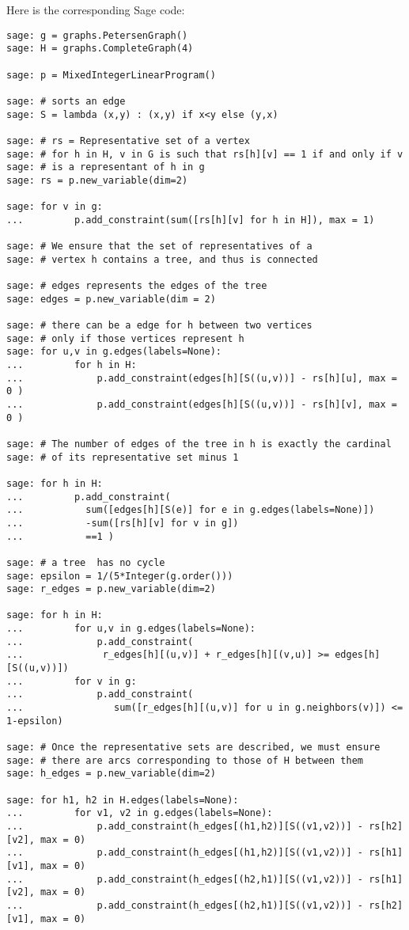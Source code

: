 Here is the corresponding Sage code:

\begin{lstlisting}
sage: g = graphs.PetersenGraph()
sage: H = graphs.CompleteGraph(4)

sage: p = MixedIntegerLinearProgram()

sage: # sorts an edge
sage: S = lambda (x,y) : (x,y) if x<y else (y,x)

sage: # rs = Representative set of a vertex
sage: # for h in H, v in G is such that rs[h][v] == 1 if and only if v
sage: # is a representant of h in g
sage: rs = p.new_variable(dim=2)

sage: for v in g:
...         p.add_constraint(sum([rs[h][v] for h in H]), max = 1)

sage: # We ensure that the set of representatives of a
sage: # vertex h contains a tree, and thus is connected

sage: # edges represents the edges of the tree
sage: edges = p.new_variable(dim = 2)

sage: # there can be a edge for h between two vertices
sage: # only if those vertices represent h
sage: for u,v in g.edges(labels=None):
...         for h in H:
...             p.add_constraint(edges[h][S((u,v))] - rs[h][u], max = 0 )
...             p.add_constraint(edges[h][S((u,v))] - rs[h][v], max = 0 )

sage: # The number of edges of the tree in h is exactly the cardinal
sage: # of its representative set minus 1

sage: for h in H:
...         p.add_constraint(
...           sum([edges[h][S(e)] for e in g.edges(labels=None)])
...           -sum([rs[h][v] for v in g])
...           ==1 )

sage: # a tree  has no cycle
sage: epsilon = 1/(5*Integer(g.order()))
sage: r_edges = p.new_variable(dim=2)

sage: for h in H:
...         for u,v in g.edges(labels=None):
...             p.add_constraint(
...              r_edges[h][(u,v)] + r_edges[h][(v,u)] >= edges[h][S((u,v))])
...         for v in g:
...             p.add_constraint(
...                sum([r_edges[h][(u,v)] for u in g.neighbors(v)]) <= 1-epsilon)

sage: # Once the representative sets are described, we must ensure
sage: # there are arcs corresponding to those of H between them
sage: h_edges = p.new_variable(dim=2)

sage: for h1, h2 in H.edges(labels=None):
...         for v1, v2 in g.edges(labels=None):
...             p.add_constraint(h_edges[(h1,h2)][S((v1,v2))] - rs[h2][v2], max = 0)
...             p.add_constraint(h_edges[(h1,h2)][S((v1,v2))] - rs[h1][v1], max = 0)
...             p.add_constraint(h_edges[(h2,h1)][S((v1,v2))] - rs[h1][v2], max = 0)
...             p.add_constraint(h_edges[(h2,h1)][S((v1,v2))] - rs[h2][v1], max = 0)




\end{lstlisting}
